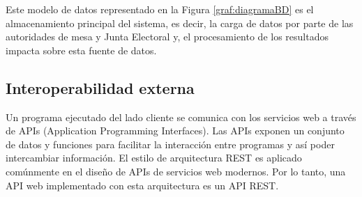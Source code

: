 Este modelo de datos representado en la Figura \ref{graf:diagramaBD} es el almacenamiento principal del sistema, es decir, la carga de datos por parte de las autoridades de mesa y Junta Electoral y, el procesamiento de los resultados impacta sobre esta fuente de datos. 

\subsection{Interoperabilidad externa}
Un programa ejecutado del lado cliente se comunica con los servicios web a través de APIs (Application Programming Interfaces). Las APIs exponen un conjunto de datos y funciones para facilitar la interacción entre programas y así poder intercambiar información. El estilo de arquitectura REST es aplicado comúnmente en el diseño de APIs de servicios web modernos. Por lo tanto, una API web implementado con esta arquitectura es un API REST. \cite{masse2011rest}

